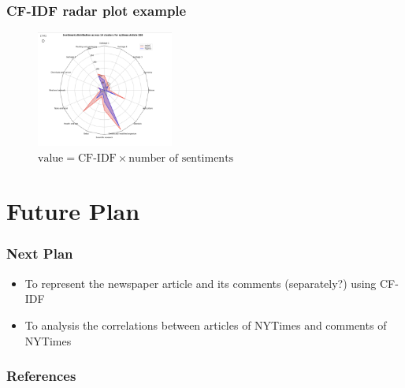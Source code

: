 \documentclass{tum-presentation}
\begin{document}
\begin{frame}
 \frametitle{CF-IDF radar plot example}
 \subframetitle{}
 \begin{center}
    \begin{figure}[t]
      \includegraphics[width=0.4\textwidth]{images/CF-IDF-nytimes-326.png}
      \caption{$\text{value} = \text{CF-IDF} \times \text{number of sentiments}$}
    \end{figure}
  \end{center}   
\end{frame}


\section{Future Plan}
\begin{frame}
  \frametitle{Next Plan}
  \large
  \begin{itemize}
    \item  To represent the newspaper article and its comments (separately?) using CF-IDF
    \item  To analysis the correlations between articles of NYTimes and comments of NYTimes
  \end{itemize}
\end{frame}
\begin{frame}
  \frametitle{References}
 
  \printbibliography

\end{frame}
\end{document}
